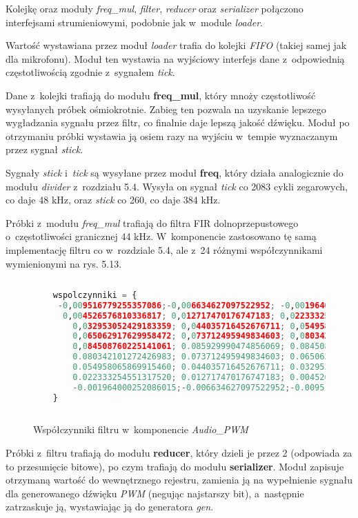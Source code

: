 Kolejkę oraz moduły \textit{freq\_mul}, \textit{filter}, \textit{reducer} oraz \textit{serializer} połączono interfejsami strumieniowymi, podobnie jak w~module \textit{loader}.

Wartość wystawiana przez moduł \textit{loader} trafia do kolejki \textit{FIFO} (takiej samej jak dla mikrofonu). Moduł ten wystawia na wyjściowy interfejs dane z~odpowiednią częstotliwością zgodnie z~sygnałem \textit{tick}.

Dane z~kolejki trafiają do modułu \textbf{freq\_mul}, który mnoży częstotliwość wysyłanych próbek ośmiokrotnie. Zabieg ten pozwala na uzyskanie lepszego wygładzania sygnału przez filtr, co finalnie daje lepszą jakość dźwięku. Moduł po otrzymaniu próbki wystawia ją osiem razy na wyjściu w~tempie wyznaczanym przez sygnał \textit{stick}.

Sygnały \textit{stick} i~\textit{tick} są wysyłane przez moduł \textbf{freq}, który działa analogicznie do modułu \textit{divider} z~rozdziału 5.4. Wysyła on sygnał \textit{tick} co 2083 cykli zegarowych, co daje 48 kHz, oraz \textit{stick} co 260, co daje 384 kHz.

Próbki z~modułu \textit{freq\_mul} trafiają do filtra FIR dolnoprzepustowego o~częstotliwości granicznej 44 kHz. W~komponencie zastosowano tę samą implementację filtru co w~rozdziale 5.4, ale z~24 różnymi współczynnikami wymienionymi na rys. 5.13.

\begin{figure}[h]
\begin{lstlisting}[language=Python]
	
	wspolczynniki = {
	 -0,009516779255357086;-0,006634627097522952; -0,001964000252086015;
	  0,004526576810336817; 0,012717470176747183; 0,022333254551317520;
		0,032953052429183359; 0,044035716452676711; 0,054958065869915460;
		0,065062917629958472; 0,073712495949834603; 0,080342101272426983;
		0,084508760225141061; 0.085929990474856069; 0.084508760225141061;
		0.080342101272426983; 0.073712495949834603; 0.065062917629958472;
		0.054958065869915460; 0.044035716452676711; 0.032953052429183359;
		0.022333254551317520; 0.012717470176747183; 0.004526576810336817;
		-0.001964000252086015;-0.006634627097522952;-0.009516779255357086
	}
	
\end{lstlisting}
	\caption{Współczynniki filtru w~komponencie \textit{Audio\_PWM}}
\end{figure}
\FloatBarrier %
Próbki z~filtru trafiają do modułu \textbf{reducer}, który dzieli je przez 2 (odpowiada za to przesunięcie bitowe), po czym trafiają do modułu \textbf{serializer}. Moduł zapisuje otrzymaną wartość do wewnętrznego rejestru, zamienia ją na wypełnienie sygnału dla generowanego dźwięku \textit{PWM} (negując najstarszy bit), a~następnie zatrzaskuje ją, wystawiając ją do generatora \textit{gen}.

